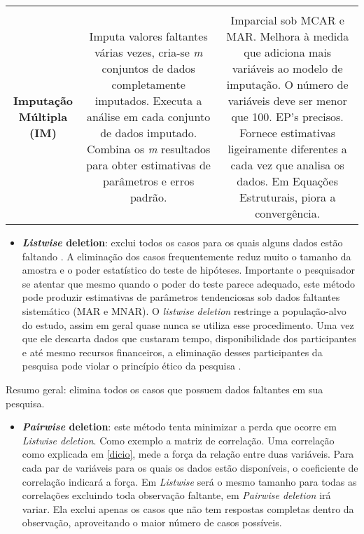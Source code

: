 \documentclass[
]{book}
\providecommand{\tightlist}{%
  \setlength{\itemsep}{0pt}\setlength{\parskip}{0pt}}
\begin{document}
\begin{longtable}[]{@{}ccc@{}}
\begin{minipage}[t]{0.30\columnwidth}
\end{minipage}\tabularnewline
\begin{minipage}[t]{0.30\columnwidth}\centering
\textbf{Imputação Múltipla (IM)}\strut
\end{minipage} & \begin{minipage}[t]{0.30\columnwidth}\centering
Imputa valores faltantes várias vezes, cria-se \emph{m} conjuntos de dados completamente imputados. Executa a análise em cada conjunto de dados imputado. Combina os \emph{m} resultados para obter estimativas de parâmetros e erros padrão.\strut
\end{minipage} & \begin{minipage}[t]{0.30\columnwidth}\centering
Imparcial sob MCAR e MAR. Melhora à medida que adiciona mais variáveis ao modelo de imputação. O número de variáveis deve ser menor que 100. EP's precisos. Fornece estimativas ligeiramente diferentes a cada vez que analisa os dados. Em Equações Estruturais, piora a convergência.\strut
\end{minipage}\tabularnewline
\bottomrule
\end{longtable}

\begin{itemize}
\tightlist
\item
  \textbf{\emph{Listwise} deletion}: exclui todos os casos para os quais alguns dados estão faltando . A eliminação dos casos frequentemente reduz muito o tamanho da amostra e o poder estatístico do teste de hipóteses. Importante o pesquisador se atentar que mesmo quando o poder do teste parece adequado, este método pode produzir estimativas de parâmetros tendenciosas sob dados faltantes sistemático (MAR e MNAR). O \emph{listwise deletion} restringe a população-alvo do estudo, assim em geral quase nunca se utiliza esse procedimento. Uma vez que ele descarta dados que custaram tempo, disponibilidade dos participantes e até mesmo recursos financeiros, a eliminação desses participantes da pesquisa pode violar o princípio ético da pesquisa \citep{rosenthal1994science}.
\end{itemize}

Resumo geral: elimina todos os casos que possuem dados faltantes em sua pesquisa.

\begin{itemize}
\tightlist
\item
  \textbf{\emph{Pairwise} deletion}: este método tenta minimizar a perda que ocorre em \emph{Listwise deletion}. Como exemplo a matriz de correlação. Uma correlação como explicada em \ref{dicio}, mede a força da relação entre duas variáveis. Para cada par de variáveis para os quais os dados estão disponíveis, o coeficiente de correlação indicará a força. Em \emph{Listwise} será o mesmo tamanho para todas as correlações excluindo toda observação faltante, em \emph{Pairwise deletion} irá variar. Ela exclui apenas os casos que não tem respostas completas dentro da observação, aproveitando o maior número de casos possíveis.
\end{itemize}
\end{document}
